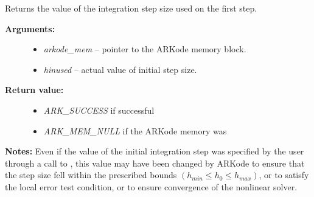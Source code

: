 \documentclass[letterpaper,10pt,english]{sphinxmanual}
\begin{document}
\begin{fulllineitems}
\label{c_interface/User_callable:ARKodeGetActualInitStep}
Returns the value of the integration step size used on the first step.
\begin{description}
\item[{\textbf{Arguments:}}] \leavevmode\begin{itemize}
\item {} 
\emph{arkode\_mem} -- pointer to the ARKode memory block.

\item {} 
\emph{hinused} -- actual value of initial step size.

\end{itemize}

\item[{\textbf{Return value:}}] \leavevmode\begin{itemize}
\item {} 
\emph{ARK\_SUCCESS} if successful

\item {} 
\emph{ARK\_MEM\_NULL} if the ARKode memory was 

\end{itemize}

\end{description}

\textbf{Notes:} Even if the value of the initial integration step was
specified by the user through a call to
{\hyperref[c_interface/User_callable:ARKodeSetInitStep]{}}, this value may have been changed by
ARKode to ensure that the step size fell within the prescribed
bounds $(h_{min} \le h_0 \le h_{max})$, or to satisfy the
local error test condition, or to ensure convergence of the
nonlinear solver.

\end{fulllineitems}

\end{document}
